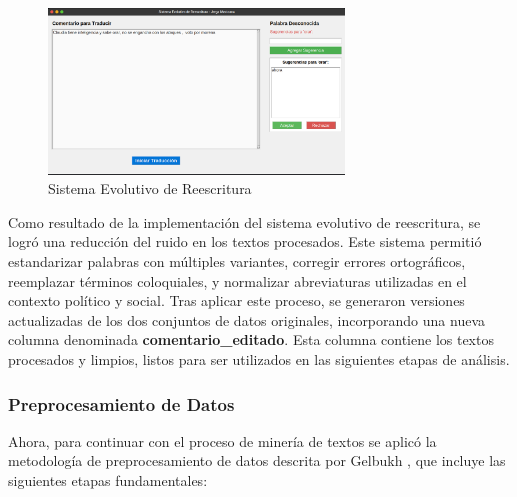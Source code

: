 \documentclass[10pt, a4paper]{article}
\begin{document}
	\begin{figure}[h!] %
		\centering
		\includegraphics[width=0.7\textwidth]{evolutivo.png} %
		\caption{Sistema Evolutivo de Reescritura} %
		\label{fig:evolutivo} %
	\end{figure}
	
	Como resultado de la implementación del sistema evolutivo de reescritura, se logró una reducción del ruido en los textos procesados. Este sistema permitió estandarizar palabras con múltiples variantes, corregir errores ortográficos, reemplazar términos coloquiales, y normalizar abreviaturas utilizadas en el contexto político y social. Tras aplicar este proceso, se generaron versiones actualizadas de los dos conjuntos de datos originales, incorporando una nueva columna denominada \textbf{comentario\_editado}. Esta columna contiene los textos procesados y limpios, listos para ser utilizados en las siguientes etapas de análisis.
	
	\subsubsection{Preprocesamiento de Datos}
	
	Ahora, para continuar con el proceso de minería de textos se aplicó la metodología de preprocesamiento de datos descrita por Gelbukh \parencite{gelbukh2003procesamiento}, que incluye las siguientes etapas fundamentales:
	
\end{document}
